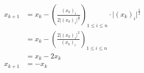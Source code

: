 \documentclass[3p, twocolumn]{elsarticle}
\begin{document}
\begin{appendices}
    \begin{align*}
        x_{k+1} & = x_k - \left(\frac{(x_k)_i}{2\lvert (x_k)_i\rvert^{\frac32}}\right)_{1\leq i\leq n}\cdot \lvert (x_k)_i\vert ^{\frac12} \\
                & = x_k - \left(\frac{2\lvert (x_k)_i \rvert^{2}}{(x_k)_i}\right)_{1\leq i\leq n}                                          \\
                & = x_k - 2x_k                                                                                                             \\
        x_{k+1} & = - x_k
    \end{align*}
\end{appendices}

\cleardoublepage
\nocite{*}


{}
\end{document}
